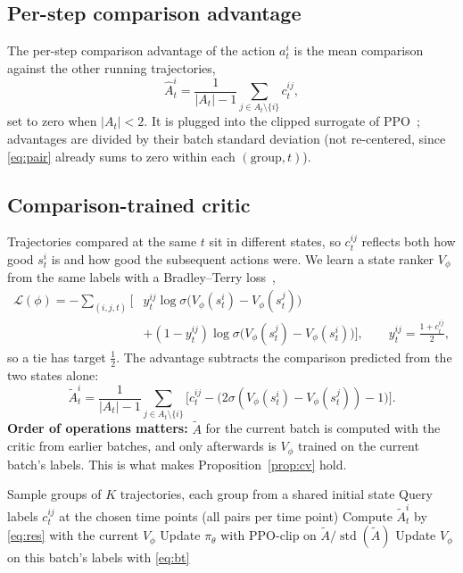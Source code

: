 \documentclass[11pt]{article}
\theoremstyle{remark}
\begin{document}
\subsection{Per-step comparison advantage}
The per-step comparison advantage of the action $a^i_t$ is the mean comparison against the other running trajectories,
\begin{equation}
\label{eq:pair}
\hat A^i_t = \frac{1}{|A_t|-1}\sum_{j\in A_t\setminus\{i\}} c^{ij}_t,
\end{equation}
set to zero when $|A_t|<2$. It is plugged into the clipped surrogate of PPO~\citep{schulman2017ppo}; advantages are divided by their batch standard deviation (not re-centered, since \eqref{eq:pair} already sums to zero within each $(\text{group},t)$).

\subsection{Comparison-trained critic}
Trajectories compared at the same $t$ sit in different states, so $c^{ij}_t$ reflects both how good $s^i_t$ is and how good the subsequent actions were. We learn a state ranker $V_\phi$ from the same labels with a Bradley--Terry loss~\citep{bradley1952rank},
\begin{equation}
\label{eq:bt}
\begin{split}
\mathcal{L}(\phi) = -\sum_{(i,j,t)} \Big[ & y^{ij}_t \log\sigma\big(V_\phi(s^i_t)-V_\phi(s^j_t)\big) \\
 & + (1-y^{ij}_t)\log\sigma\big(V_\phi(s^j_t)-V_\phi(s^i_t)\big)\Big],\qquad y^{ij}_t=\tfrac{1+c^{ij}_t}{2},
\end{split}
\end{equation}
so a tie has target $\tfrac12$. The advantage subtracts the comparison predicted from the two states alone:
\begin{equation}
\label{eq:res}
\tilde A^i_t = \frac{1}{|A_t|-1}\sum_{j\in A_t\setminus\{i\}} \Big[ c^{ij}_t - \big(2\sigma(V_\phi(s^i_t)-V_\phi(s^j_t))-1\big) \Big].
\end{equation}
\textbf{Order of operations matters:} $\tilde A$ for the current batch is computed with the critic from earlier batches, and only afterwards is $V_\phi$ trained on the current batch's labels. This is what makes Proposition~\ref{prop:cv} hold.

\begin{algorithm}[t]
\caption{Per-step comparison policy optimization with a comparison-trained critic}
\label{alg:main}
\begin{algorithmic}[1]
  \State Sample groups of $K$ trajectories, each group from a shared initial state
  \State Query labels $c^{ij}_t$ at the chosen time points (all pairs per time point)
  \State Compute $\tilde A^i_t$ by \eqref{eq:res} with the current $V_\phi$ 
  \State Update $\pi_\theta$ with PPO-clip on $\tilde A / \operatorname{std}(\tilde A)$
  \State Update $V_\phi$ on this batch's labels with \eqref{eq:bt}
\EndFor
\end{algorithmic}
\end{algorithm}
\end{document}
